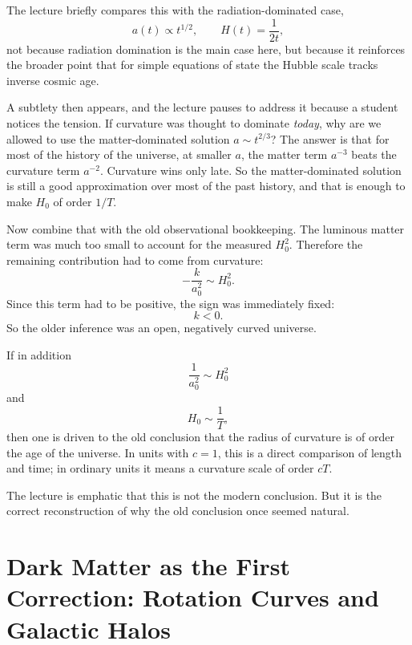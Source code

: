 The lecture briefly compares this with the radiation-dominated case,
\begin{equation}
a(t)\propto t^{1/2},
\qquad
H(t)=\frac{1}{2t},
\end{equation}
not because radiation domination is the main case here, but because it reinforces the broader point that for simple equations of state the Hubble scale tracks inverse cosmic age.

A subtlety then appears, and the lecture pauses to address it because a student notices the tension. If curvature was thought to dominate \emph{today}, why are we allowed to use the matter-dominated solution \(a\sim t^{2/3}\)? The answer is that for most of the history of the universe, at smaller \(a\), the matter term \(a^{-3}\) beats the curvature term \(a^{-2}\). Curvature wins only late. So the matter-dominated solution is still a good approximation over most of the past history, and that is enough to make \(H_0\) of order \(1/T\).

Now combine that with the old observational bookkeeping. The luminous matter term was much too small to account for the measured \(H_0^2\). Therefore the remaining contribution had to come from curvature:
\begin{equation}
-\frac{k}{a_0^2}\sim H_0^2.
\end{equation}
Since this term had to be positive, the sign was immediately fixed:
\begin{equation}
k<0.
\end{equation}
So the older inference was an open, negatively curved universe.

If in addition
\begin{equation}
\frac{1}{a_0^2}\sim H_0^2
\end{equation}
and
\begin{equation}
H_0\sim \frac{1}{T},
\end{equation}
then one is driven to the old conclusion that the radius of curvature is of order the age of the universe. In units with \(c=1\), this is a direct comparison of length and time; in ordinary units it means a curvature scale of order \(cT\).

The lecture is emphatic that this is not the modern conclusion. But it is the correct reconstruction of why the old conclusion once seemed natural.

\section{Dark Matter as the First Correction: Rotation Curves and Galactic Halos}

